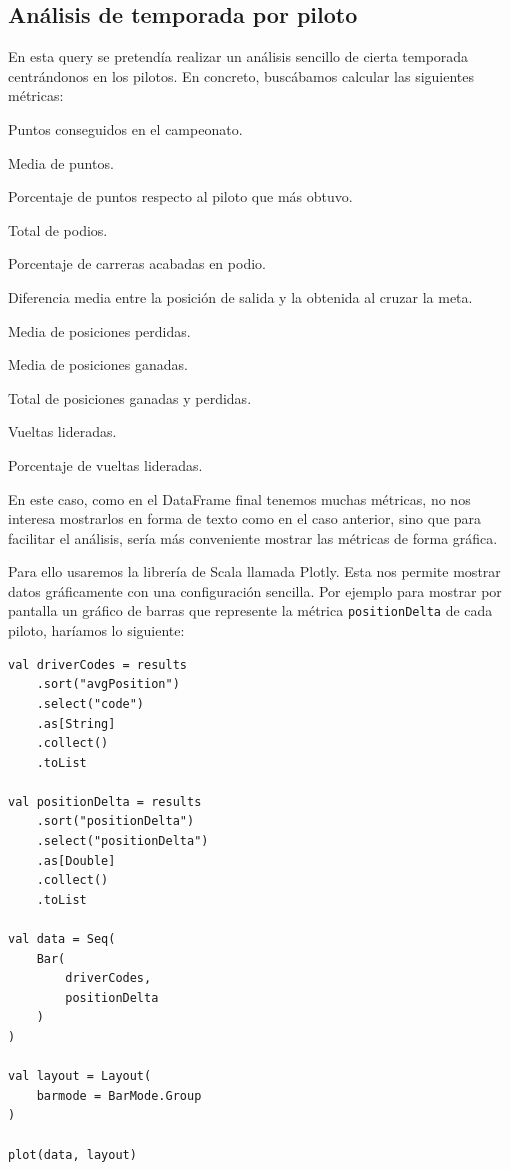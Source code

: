 \documentclass[12pt,twoside,titlepage]{report}
\begin{document}
\subsection{Análisis de temporada por piloto}

En esta query se pretendía realizar un análisis sencillo de cierta temporada centrándonos en los pilotos. En concreto, buscábamos calcular las siguientes métricas:

\begin{compactitem}
	\item Puntos conseguidos en el campeonato.
	\item Media de puntos.
	\item Porcentaje de puntos respecto al piloto que más obtuvo.
	\item Total de podios.
	\item Porcentaje de carreras acabadas en podio.
	\item Diferencia media entre la posición de salida y la obtenida al cruzar la meta.
	\item Media de posiciones perdidas.
	\item Media de posiciones ganadas.
	\item Total de posiciones ganadas y perdidas.
	\item Vueltas lideradas.
	\item Porcentaje de vueltas lideradas.
\end{compactitem}

En este caso, como en el DataFrame final tenemos muchas métricas, no nos interesa mostrarlos en forma de texto como en el caso anterior, sino que para facilitar el análisis, sería más conveniente mostrar las métricas de forma gráfica.

Para ello usaremos la librería de Scala llamada Plotly. Esta nos permite mostrar datos gráficamente con una configuración sencilla. Por ejemplo para mostrar por pantalla un gráfico de barras que represente la métrica \texttt{positionDelta} de cada piloto, haríamos lo siguiente:

\begin{lstlisting}
val driverCodes = results
	.sort("avgPosition")
	.select("code")
	.as[String]
	.collect()
	.toList
	
val positionDelta = results
	.sort("positionDelta")
	.select("positionDelta")
	.as[Double]
	.collect()
	.toList
	
val data = Seq(
	Bar(
		driverCodes,  
		positionDelta
	)
)
	
val layout = Layout( 
	barmode = BarMode.Group
)
	
plot(data, layout)
\end{lstlisting}
\end{document}
